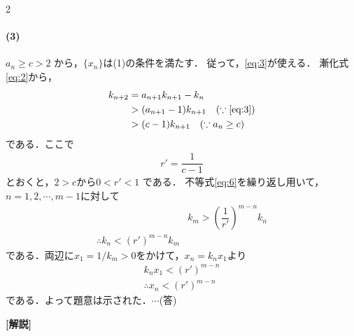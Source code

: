 \documentclass[../../main.tex]{subfiles}
\begin{document}
\begin{multicols}{2}
  \paragraph{(3)}
  $a_n \ge c > 2$ から，$\{x_n\}$は(1)の条件を満たす．
  従って，\cref{eq:3}が使える．
  漸化式\cref{eq:2}から，
  \begin{align}
    k_{n+2} & = a_{n+1} k_{n+1} - k_n                                          \\
    & > (a_{n+1}-1) k_{n+1} \quad (\because \text{\cref{eq:3}}) \\
    & > (c-1) k_{n+1} \quad (\because a_n \ge c) \label{eq:6}
  \end{align}
  である．ここで
  \begin{align}
    r' = \dfrac{1}{c-1}
  \end{align}
  とおくと，$2 > c$から$0 < r' < 1$ である．
  不等式\cref{eq:6}を繰り返し用いて，$n=1,2,\cdots,m-1$に対して
  \begin{align}
    & k_m > \left(\dfrac{1}{r'}\right)^{m-n} k_n \\
    \therefore
    k_n < \left(r'\right)^{m-n} k_m
  \end{align}
  である．両辺に$x_1 = 1/k_m>0$をかけて，$x_n=k_nx_1$より
  \begin{align}
    k_n x_1 < \left(r'\right)^{m-n} \\
    \therefore
    x_n < \left(r'\right)^{m-n}
  \end{align}
  である．よって題意は示された．$\cdots$(答)

  {\bf [解説]}

  \newpage
\end{multicols}
\end{document}
